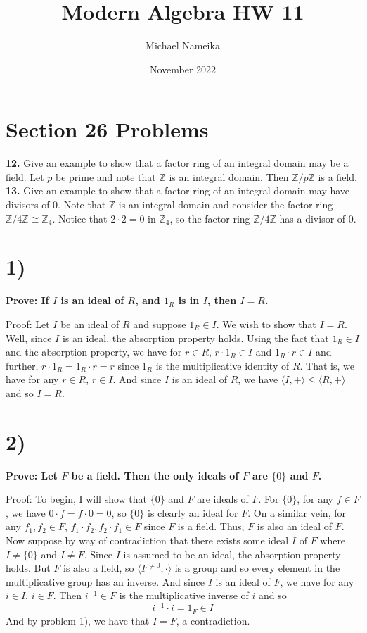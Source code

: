 \documentclass{article}
\title{Modern Algebra HW 11}
\author{Michael Nameika}
\date{November 2022}
\begin{document}
\maketitle

\section*{Section 26 Problems}
\textbf{12.} Give an example to show that a factor ring of an integral domain may be a field. 
\newline\newline
Let $p$ be prime and note that $\mathbb{Z}$ is an integral domain. Then $\mathbb{Z}/p\mathbb{Z}$ is a field.
\newline\newline
\textbf{13.} Give an example to show that a factor ring of an integral domain may have divisors of 0. 
\newline\newline
Note that $\mathbb{Z}$ is an integral domain and consider the factor ring $\mathbb{Z}/4\mathbb{Z} \cong \mathbb{Z}_4$. Notice that $2\cdot 2 = 0$ in $\mathbb{Z}_4$, so the factor ring $\mathbb{Z}/4\mathbb{Z}$ has a divisor of 0.



\section*{1)}
\textbf{Prove: If $I$ is an ideal of $R$, and $1_R$ is in $I$, then $I = R$.}

Proof: Let $I$ be an ideal of $R$ and suppose $1_R \in I$. We wish to show that $I = R$. Well, since $I$ is an ideal, the absorption property holds. 
Using the fact that $1_R \in I$ and the absorption property, we have for $r \in R$, $r\cdot 1_R \in I$ and $1_R \cdot r \in I$ and further, $r\cdot 1_R = 1_R \cdot r = r$ since $1_R$ is the multiplicative identity of $R$. That is, we have for any $r \in R$, $r \in I$. 
And since $I$ is an ideal of $R$, we have $\langle I, + \rangle \leq \langle R, + \rangle$ and so $I = R$. 

\section*{2)}
\textbf{Prove: Let $F$ be a field. Then the only ideals of $F$ are $\{0\}$ and $F$.}

Proof: To begin, I will show that $\{0\}$ and $F$ are ideals of $F$. For $\{0\}$, for any $f \in F$, we have $0\cdot f = f \cdot 0 = 0$, so $\{0\}$ is clearly an ideal for $F$. 
On a similar vein, for any $f_1, f_2 \in F$, $f_1 \cdot f_2, f_2 \cdot f_1 \in F$ since $F$ is a field. 
Thus, $F$ is also an ideal of $F$. Now suppose by way of contradiction that there exists some ideal $I$ of $F$ where $I \neq \{0\}$ and $I \neq F$. 
Since $I$ is assumed to be an ideal, the absorption property holds. But $F$ is also a field, so $\langle F^{\neq 0}, \cdot \rangle$ is a group and so every element in the multiplicative group has an inverse. 
And since $I$ is an ideal of $F$, we have for any $i \in I$, $i \in F$. 
Then $i^{-1} \in F$ is the multiplicative inverse of $i$ and so 
\[i^{-1}\cdot i = 1_F \in I\]
And by problem 1), we have that $I = F$, a contradiction. 
\end{document}
